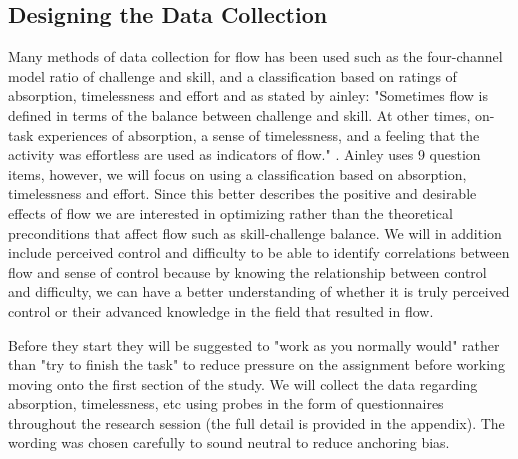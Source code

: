 \documentclass{article}
\begin{document}

    
\subsection{Designing the Data Collection}


Many methods of data collection for flow has been used such as the four-channel model ratio of challenge and skill, and a classification based on ratings of absorption, timelessness and effort and as stated by ainley: "Sometimes flow is defined in terms of the balance between challenge and skill. At other times, on-task experiences of absorption, a sense of timelessness, and a feeling that the activity was effortless are used as indicators of flow." \parencite{AINLEY2008109}. Ainley uses 9 question items, however, we will focus on using a classification based on absorption, timelessness and effort. Since this better describes the positive and desirable effects of flow we are interested in optimizing rather than the theoretical preconditions that affect flow such as skill-challenge balance. We will in addition include perceived control and difficulty to be able to identify correlations between flow and sense of control because by knowing the relationship between control and difficulty, we can have a better understanding of whether it is truly perceived control or their advanced knowledge in the field that resulted in flow.

Before they start they will be suggested to "work as you normally would" rather than "try to finish the task" to reduce pressure on the assignment before working moving onto the first section of the study. We will collect the data regarding absorption, timelessness, etc using probes in the form of questionnaires throughout the research session (the full detail is provided in the appendix). The wording was chosen carefully to sound neutral to reduce anchoring bias.
\end{document}
